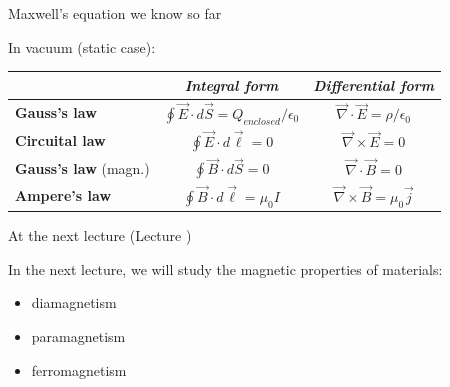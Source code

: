 %
%
%

\begin{frame}{Maxwell's equation we know so far}

In vacuum (static case):

\begin{center}
 {
  \begin{table}[H]
    \begin{tabular}{|l|c|c|}
      \hline
          & {\it Integral form} & {\it Differential form} \\
      \hline
      {\bf Gauss's law} &
        $\oint \vec{E} \cdot d\vec{S} = Q_{enclosed} / \epsilon_0$ &
        $\vec{\nabla} \cdot \vec{E} = \rho / \epsilon_0$ \\

      {\bf Circuital law} &
        $\oint \vec{E} \cdot d\vec{\ell} = 0$ &
        $\vec{\nabla} \times \vec{E} = 0$ \\

      {\bf Gauss's law} (magn.) &
        $\oint \vec{B} \cdot d\vec{S} = 0$ &
        $\vec{\nabla} \cdot \vec{B} = 0$ \\

      {\bf Ampere's law} &
        $\oint \vec{B} \cdot d\vec{\ell} = \mu_{0} I $ &
        $\vec{\nabla} \times \vec{B} = \mu_{0} \vec{j}$ \\

      \hline
    \end{tabular}
  \end{table}
 }
\end{center}

\end{frame}


%
%

\renewcommand{\lecturesummarytitle}{Main points to remember }


%
%

\begin{frame}{At the next lecture (Lecture \nextlecture)}

In the next lecture, we will study the magnetic properties of materials:
\vspace{0.2cm}
\begin{itemize}
  \item diamagnetism
  \item paramagnetism
  \item ferromagnetism
\end{itemize}

\end{frame}

%
%



